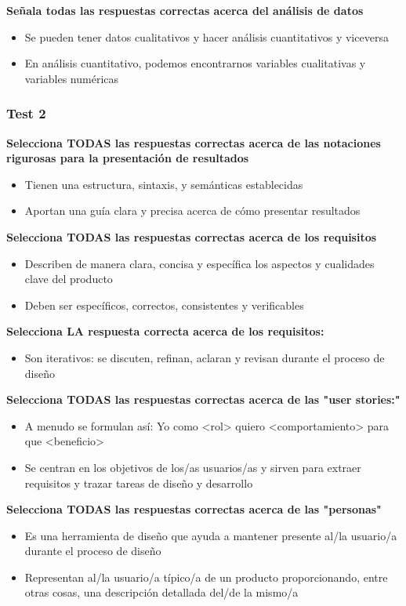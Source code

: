\documentclass[12pt, twoside, openright]{report} %
\begin{document}
\textbf{Señala todas las respuestas correctas acerca del análisis de datos}
\begin{itemize}
  \item Se pueden tener datos cualitativos y hacer análisis cuantitativos y viceversa
  \item En análisis cuantitativo, podemos encontrarnos variables cualitativas y variables numéricas
\end{itemize}
\pagebreak
\subsubsection{Test 2}

\textbf{Selecciona TODAS las respuestas correctas acerca de las notaciones rigurosas para la presentación de resultados}
\begin{itemize}
  \item Tienen una estructura, sintaxis, y semánticas establecidas
  \item Aportan una guía clara y precisa acerca de cómo presentar resultados
\end{itemize}

\textbf{Selecciona TODAS las respuestas correctas acerca de los requisitos}
\begin{itemize}
  \item Describen de manera clara, concisa y específica los aspectos y cualidades clave del producto
  \item Deben ser específicos, correctos, consistentes y verificables
\end{itemize}

\textbf{Selecciona LA respuesta correcta acerca de los requisitos:}
\begin{itemize}
  \item Son iterativos: se discuten, refinan, aclaran y revisan durante el proceso de diseño
\end{itemize}

\textbf{Selecciona TODAS las respuestas correctas acerca de las "user stories:"}
\begin{itemize}
  \item A menudo se formulan así: Yo como <rol> quiero <comportamiento> para que <beneficio>
  \item Se centran en los objetivos de los/as usuarios/as y sirven para extraer requisitos y trazar tareas de diseño y desarrollo
\end{itemize}

\textbf{Selecciona TODAS las respuestas correctas acerca de las "personas"}
\begin{itemize}
  \item Es una herramienta de diseño que ayuda a mantener presente al/la usuario/a durante el proceso de diseño
  \item Representan al/la usuario/a típico/a de un producto proporcionando, entre otras cosas,  una descripción detallada del/de la mismo/a
\end{itemize}
\end{document}
